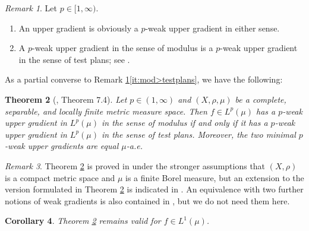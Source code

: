 \documentclass[11pt]{amsart}
\newtheorem{theorem}{Theorem}[section]
\newtheorem{corollary}[theorem]{Corollary}
\theoremstyle{definition}
\theoremstyle{remark}
\newtheorem{remark}[theorem]{Remark}
\numberwithin{equation}{section}
\begin{document}
\begin{remark}\label{rem:ug-relations}Let $p\in[1,\infty)$.
\begin{enumerate}[\rm(i)]
\item An upper gradient is obviously a $p$-weak upper gradient in either sense.
  \item\label{it:mod>testplans} A $p$-weak upper gradient in the sense of modulus is a
  $p$-weak upper gradient in the sense of test plans; see \cite[Remark 4.12]{AGS:13}.
\end{enumerate}
\end{remark}

As a partial converse to Remark \ref{rem:ug-relations}\eqref{it:mod>testplans}, we have the
following:

\begin{theorem}[\cite{AGS:13}, Theorem 7.4]\label{thm:AGS7.4}
Let $p\in(1,\infty)$ and $(X,\rho,\mu)$ be a complete, separable, and locally finite metric
measure space.
Then $f\in L^p(\mu)$ has a $p$-weak upper gradient in $L^p(\mu)$ in the sense of modulus if
and only if
it has a $p$-weak upper gradient in $L^p(\mu)$ in the sense of test plans. Moreover,
the two minimal $p$-weak upper gradients are equal $\mu$-a.e.
\end{theorem}

\begin{remark}
Theorem \ref{thm:AGS7.4} is proved in \cite[Section 7]{AGS:13} under the stronger
assumptions that $(X,\rho)$ is a compact metric space and $\mu$ is a finite Borel measure,
but an extension to the version formulated in Theorem \ref{thm:AGS7.4} is indicated in
\cite[Section 8.2]{AGS:13}.
 An equivalence with two further notions of weak gradients is also contained in
 \cite[Theorem 7.4]{AGS:13}, but we do not need them here.
\end{remark}

\begin{corollary}\label{cor:AGS7.4}
Theorem \ref{thm:AGS7.4} remains valid for $f\in L^1(\mu)$.
\end{corollary}
\end{document}
